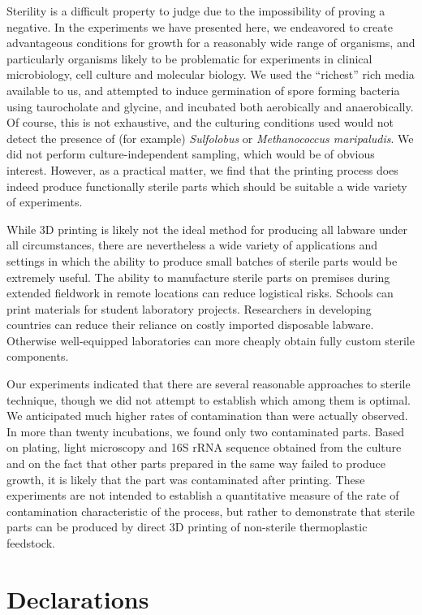\documentclass[fleqn,10pt]{wlpeerj}
\begin{document}
Sterility is a difficult property to judge due to the impossibility of proving a negative. In the experiments we have presented here, we endeavored to create advantageous conditions for growth for a reasonably wide range of organisms, and particularly organisms likely to be problematic for experiments in clinical microbiology, cell culture and molecular biology. We used the ``richest'' rich media available to us, and attempted to induce germination of spore forming bacteria using taurocholate and glycine, and incubated both aerobically and anaerobically. Of course, this is not exhaustive, and  the culturing conditions used would not detect the presence of (for example) {\em Sulfolobus} or {\em Methanococcus maripaludis}. We did not perform culture-independent sampling, which would be of obvious interest. However, as a practical matter, we find that the printing process does indeed produce functionally sterile parts which should be suitable a wide variety of experiments.

While 3D printing is likely not the ideal method for producing all labware under all circumstances, there are nevertheless a wide variety of applications and settings in which the ability to produce small batches of sterile parts would be extremely useful. The ability to manufacture sterile parts on premises during extended fieldwork in remote locations can reduce logistical risks. Schools can print materials for student laboratory projects. Researchers in developing countries can reduce their reliance on costly imported disposable labware. Otherwise well-equipped laboratories can more cheaply obtain fully custom sterile components.

Our experiments indicated that there are several reasonable approaches to sterile technique, though we did not attempt to establish which among them is optimal. We anticipated much higher rates of contamination than were actually observed. In more than twenty incubations, we found only two contaminated parts. Based on plating, light microscopy and 16S rRNA sequence obtained from the culture and on the fact that other parts prepared in the same way failed to produce growth, it is likely that the part was contaminated after printing. These experiments are not intended to establish a quantitative measure of the rate of contamination characteristic of the process, but rather to demonstrate that sterile parts can be produced by direct 3D printing of non-sterile thermoplastic feedstock.

\section{Declarations}
\end{document}
